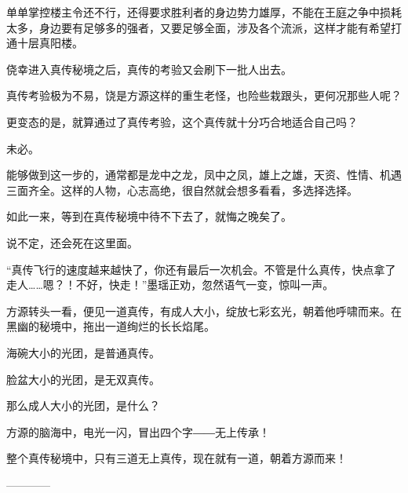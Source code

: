 \begin{this_body}
单单掌控楼主令还不行，还得要求胜利者的身边势力雄厚，不能在王庭之争中损耗太多，身边要有足够多的强者，又要足够全面，涉及各个流派，这样才能有希望打通十层真阳楼。

侥幸进入真传秘境之后，真传的考验又会刷下一批人出去。

真传考验极为不易，饶是方源这样的重生老怪，也险些栽跟头，更何况那些人呢？

更变态的是，就算通过了真传考验，这个真传就十分巧合地适合自己吗？

未必。

能够做到这一步的，通常都是龙中之龙，凤中之凤，雄上之雄，天资、性情、机遇三面齐全。这样的人物，心志高绝，很自然就会想多看看，多选择选择。

如此一来，等到在真传秘境中待不下去了，就悔之晚矣了。

说不定，还会死在这里面。

“真传飞行的速度越来越快了，你还有最后一次机会。不管是什么真传，快点拿了走人……嗯？！不好，快走！”墨瑶正劝，忽然语气一变，惊叫一声。

方源转头一看，便见一道真传，有成人大小，绽放七彩玄光，朝着他呼啸而来。在黑幽的秘境中，拖出一道绚烂的长长焰尾。

海碗大小的光团，是普通真传。

脸盆大小的光团，是无双真传。

那么成人大小的光团，是什么？

方源的脑海中，电光一闪，冒出四个字――无上传承！

整个真传秘境中，只有三道无上真传，现在就有一道，朝着方源而来！

------------

\end{this_body}

